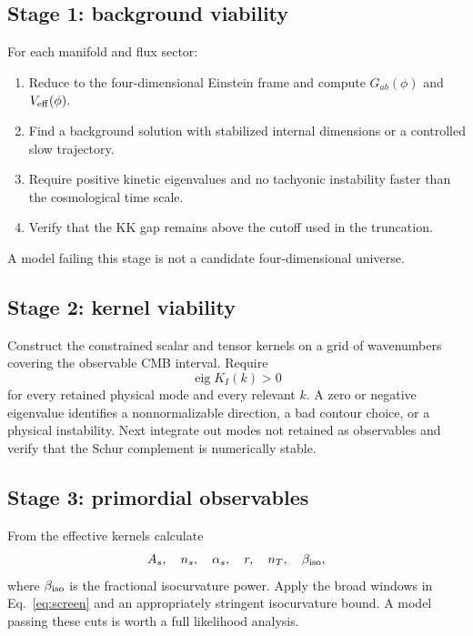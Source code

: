 \documentclass[aps,prd,twocolumn,superscriptaddress,nofootinbib,longbibliography,floatfix]{revtex4-2}
\begin{document}
\subsection{Stage 1: background viability}
For each manifold and flux sector:
\begin{enumerate}
\item Reduce to the four-dimensional Einstein frame and compute $G_{ab}(\phi)$ and $V_{\rm eff}(\phi)$.
\item Find a background solution with stabilized internal dimensions or a controlled slow trajectory.
\item Require positive kinetic eigenvalues and no tachyonic instability faster than the cosmological time scale.
\item Verify that the KK gap remains above the cutoff used in the truncation.
\end{enumerate}
A model failing this stage is not a candidate four-dimensional universe.

\subsection{Stage 2: kernel viability}
Construct the constrained scalar and tensor kernels on a grid of wavenumbers covering the observable CMB interval. Require
\begin{equation}
\operatorname{eig}K_I(k)>0
\end{equation}
for every retained physical mode and every relevant $k$. A zero or negative eigenvalue identifies a nonnormalizable direction, a bad contour choice, or a physical instability. Next integrate out modes not retained as observables and verify that the Schur complement is numerically stable.

\subsection{Stage 3: primordial observables}
From the effective kernels calculate
\begin{equation}
A_s,\quad n_s,\quad\alpha_s,\quad r,\quad n_T,
\quad\beta_{\rm iso},
\end{equation}
where $\beta_{\rm iso}$ is the fractional isocurvature power. Apply the broad windows in Eq.~\eqref{eq:screen} and an appropriately stringent isocurvature bound. A model passing these cuts is worth a full likelihood analysis.
\end{document}

